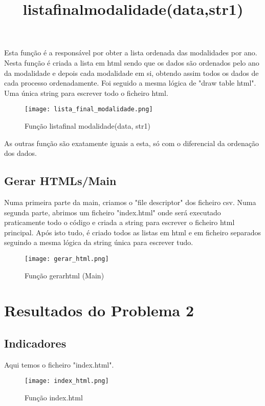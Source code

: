 \documentclass[11pt,a4paper]{report}%
\begin{document}
\title{\textbf{lista\textunderscore final\textunderscore modalidade(data,str1)}}

Esta função é a responsável por obter a lista ordenada das modalidades por ano.
Nesta função é criada a lista em html sendo que os dados são ordenados pelo ano da modalidade e depois cada modalidade em si, obtendo assim todos os dados de cada processo ordenadamente. Foi seguido a mesma lógica de "draw \textunderscore table \textunderscore html". Uma única string para escrever todo o ficheiro html.


\begin{figure}[htbp]
\centerline{\texttt{[image: lista\_final\_modalidade.png]}}
\caption{Função lista\textunderscore final \textunderscore modalidade(data, str1)}
\label{fig}
\end{figure}  
As outras função são exatamente iguais a esta, só com o diferencial da ordenação dos dados.


\newpage
\subsection{Gerar HTMLs/Main} \label{subsec:htmlGenerator}
Numa primeira parte da main, criamos o "file descriptor" dos ficheiro csv.
Numa segunda parte, abrimos um ficheiro "index.html" onde será executado praticamente todo o código e criada a string para escrever o ficheiro html principal.
Após isto tudo, é criado todos as listas em html e em ficheiro separados seguindo a mesma lógica da string única para escrever tudo.


\begin{figure}[htbp]
\centerline{\texttt{[image: gerar\_html.png]}}
\caption{Função gerar\textunderscore html (Main)}
\label{fig}
\end{figure}


\newpage
\section{Resultados do Problema 2} \label{sec:resProb2} %
\subsection{Indicadores} \label{subsec:indc}
Aqui temos o ficheiro "index.html".

\begin{figure}[htbp]
\centerline{\texttt{[image: index\_html.png]}}
\caption{Função index.html}
\label{fig}
\end{figure}
\newpage
\end{document}
